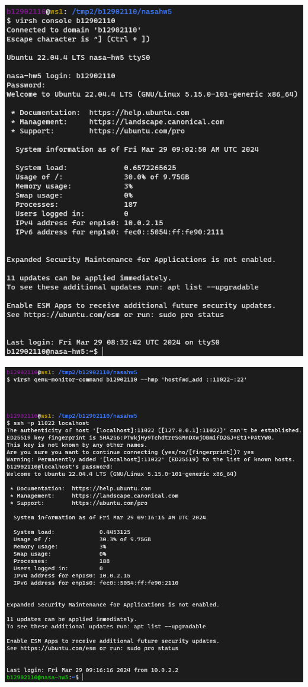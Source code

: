 \documentclass[12pt, a4paper]{article}
\begin{document}
\begin{enumerate}
    \begin{minipage}[t]{0.47\textwidth}
      \includegraphics[width=\textwidth]{1-2_virsh_console.png}
    \end{minipage}
    \begin{minipage}[t]{0.48\textwidth}
      \includegraphics[width=\textwidth]{1-2_ssh.png}
    \end{minipage}
  \end{enumerate}
\end{document}
